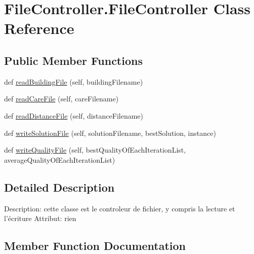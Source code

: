 \hypertarget{class_file_controller_1_1_file_controller}{}\section{File\+Controller.\+File\+Controller Class Reference}
\label{class_file_controller_1_1_file_controller}
\subsection*{Public Member Functions}
\begin{DoxyCompactItemize}
\item 
def \mbox{\hyperlink{class_file_controller_1_1_file_controller_a2302794d8bc553158b300c868dcc32c1}{read\+Building\+File}} (self, building\+Filename)
\item 
def \mbox{\hyperlink{class_file_controller_1_1_file_controller_a29b92a4d19263d13732a9edf7d218602}{read\+Care\+File}} (self, care\+Filename)
\item 
def \mbox{\hyperlink{class_file_controller_1_1_file_controller_a77fe65432e567dc86472b95759db1ee7}{read\+Distance\+File}} (self, distance\+Filename)
\item 
def \mbox{\hyperlink{class_file_controller_1_1_file_controller_a5d023bfee30423bd602d153f08f89910}{write\+Solution\+File}} (self, solution\+Filename, best\+Solution, instance)
\item 
def \mbox{\hyperlink{class_file_controller_1_1_file_controller_add13ed4f13f217efae17bd3f2e0f1563}{write\+Quality\+File}} (self, best\+Quality\+Of\+Each\+Iteration\+List, average\+Quality\+Of\+Each\+Iteration\+List)
\end{DoxyCompactItemize}


\subsection{Detailed Description}
\begin{DoxyVerb}Description: cette classe est le controleur de fichier, y compris la lecture et l'écriture
Attribut: rien
\end{DoxyVerb}
 

\subsection{Member Function Documentation}
\mbox{\label{class_file_controller_1_1_file_controller_a2302794d8bc553158b300c868dcc32c1}} 
